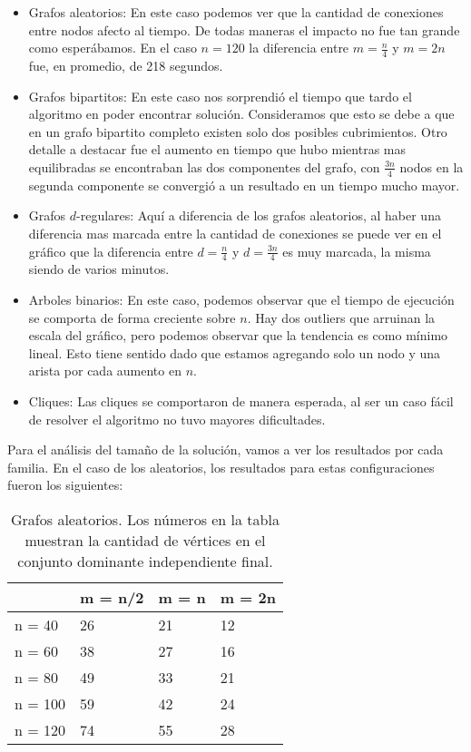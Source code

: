 \begin{itemize}
	\item Grafos aleatorios: En este caso podemos ver que la cantidad de conexiones entre nodos afecto al tiempo. De todas maneras el impacto no fue tan grande como esperábamos. En el caso $n = 120$ la diferencia entre $m = \frac{n}{4}$ y $m = 2n$ fue, en promedio, de 218 segundos.
	\item Grafos bipartitos: En este caso nos sorprendió el tiempo que tardo el algoritmo en poder encontrar solución. Consideramos que esto se debe a que en un grafo bipartito completo existen solo dos posibles cubrimientos. Otro detalle a destacar fue el aumento en tiempo que hubo mientras mas equilibradas se encontraban las dos componentes del grafo, con $\frac{3n}{4}$ nodos en la segunda componente se convergió a un resultado en un tiempo mucho mayor.
	\item Grafos $d$-regulares: Aquí a diferencia de los grafos aleatorios, al haber una diferencia mas marcada entre la cantidad de conexiones se puede ver en el gráfico que la diferencia entre $d = \frac{n}{4}$ y $d = \frac{3n}{4}$ es muy marcada, la misma siendo de varios minutos.
	\item Arboles binarios: En este caso, podemos observar que el tiempo de ejecución se comporta de forma creciente sobre $n$. Hay dos outliers que arruinan la escala del gráfico, pero podemos observar que la tendencia es como mínimo lineal. Esto tiene sentido dado que estamos agregando solo un nodo y una arista por cada aumento en $n$.
	\item Cliques: Las cliques se comportaron de manera esperada, al ser un caso fácil de resolver el algoritmo no tuvo mayores dificultades.
\end{itemize}

Para el análisis del tamaño de la solución, vamos a ver los resultados por cada familia. En el caso de los aleatorios, los resultados para estas configuraciones fueron los siguientes:

\begin{table}[H]
\centering
\label{my-label}
\begin{tabular}{|l|lll|}
\hline
        & \multicolumn{1}{l|}{m = n/2} & \multicolumn{1}{l|}{m = n} & m = 2n \\ \hline
n = 40  & 26                           & 21                         & 12     \\ \cline{1-1}
n = 60  & 38                           & 27                         & 16     \\ \cline{1-1}
n = 80  & 49                           & 33                         & 21     \\ \cline{1-1}
n = 100 & 59                           & 42                         & 24     \\ \cline{1-1}
n = 120 & 74                           & 55                         & 28     \\ \hline
\end{tabular}
\caption{Grafos aleatorios. Los números en la tabla muestran la cantidad de vértices en el conjunto dominante independiente final.}
\end{table}

